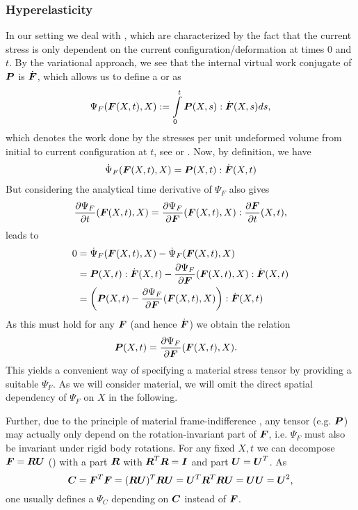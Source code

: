 \subsubsection{Hyperelasticity}
In our setting we deal with , which are characterized by the fact that the current stress is only dependent on the
current configuration/deformation at times $0$ and $t$.
By the variational approach, we see that the internal virtual work conjugate of $\boldsymbol{P}$ is $\dot{\boldsymbol{F}}$,
which allows us to define a  or  as
\begin{align}
	\Psi_F(\boldsymbol{F}(X,t),X) := \int\limits_{0}^{t}\boldsymbol{P}(X,s):\dot{\boldsymbol{F}}(X,s)ds,
\end{align}
which denotes the work done by the stresses per unit undeformed volume from initial to current configuration at $t$,
see \cite[p.156]{Bonet2008} or \cite[p.207]{Holzapfel2000}.
Now, by definition, we have
\begin{align}
	\dot{\Psi}_F(\boldsymbol{F}(X,t),X) = \boldsymbol{P}(X,t):\dot{\boldsymbol{F}}(X,t)\label{eq:psif_dt1}
\end{align}
But considering the analytical time derivative of $\Psi_F$ also gives 
\begin{align}
	\frac{\partial \Psi_F}{\partial t}(\boldsymbol{F}(X,t),X) = \frac{\partial \Psi_F}{\partial \boldsymbol{F}}(\boldsymbol{F}(X,t),X):\frac{\partial \boldsymbol{F}}{\partial t}(X,t),\label{eq:psif_dt2} 
\end{align}
leads to
\begin{align*}
	0 &= \dot{\Psi}_F(\boldsymbol{F}(X,t),X) - \dot{\Psi}_F(\boldsymbol{F}(X,t),X)\\
	 &= \boldsymbol{P}(X,t):\dot{\boldsymbol{F}}(X,t) - \frac{\partial \Psi_F}{\partial \boldsymbol{F}}(\boldsymbol{F}(X,t),X):\dot{\boldsymbol{F}}(X,t)\\
	 &= \left(\boldsymbol{P}(X,t) - \frac{\partial \Psi_F}{\partial \boldsymbol{F}}(\boldsymbol{F}(X,t),X)\right):\dot{\boldsymbol{F}}(X,t)
\end{align*}
As this must hold for any $\boldsymbol{F}$ (and hence $\dot{\boldsymbol{F}}$) we obtain the relation
\begin{align}
	\boldsymbol{P}(X,t) &= \frac{\partial \Psi_F}{\partial \boldsymbol{F}}(\boldsymbol{F}(X,t),X).
\end{align}
This yields a convenient way of specifying a material stress tensor by providing a suitable $\Psi_F$.
As we will consider  material, we will omit the direct spatial dependency of $\Psi_F$ on $X$ in the following.

Further, due to the principle of material frame-indifference \cite[p.198]{Holzapfel2000}, any tensor (e.g. $\boldsymbol{P}$)
may actually only depend on the rotation-invariant part of $\boldsymbol{F}$, i.e. $\Psi_F$ must also be invariant under rigid body rotations.
For any fixed $X,t$ we can decompose $\boldsymbol{F} = \boldsymbol{R}\boldsymbol{U}$ (\cite[p.85]{Holzapfel2000}) with a
 part $\boldsymbol{R}$ with $\boldsymbol{R}^T\boldsymbol{R} = \boldsymbol{I}$ and  part $\boldsymbol{U} = \boldsymbol{U}^T$.
As
\[
	\boldsymbol{C} = \boldsymbol{F}^T\boldsymbol{F} = (\boldsymbol{R}\boldsymbol{U})^T\boldsymbol{R}\boldsymbol{U} = \boldsymbol{U}^T\boldsymbol{R}^T\boldsymbol{R}\boldsymbol{U} = \boldsymbol{U}\boldsymbol{U} = \boldsymbol{U}^2, 
\]
one usually defines a $\Psi_C$ depending on $\boldsymbol{C}$ instead of $\boldsymbol{F}$.

